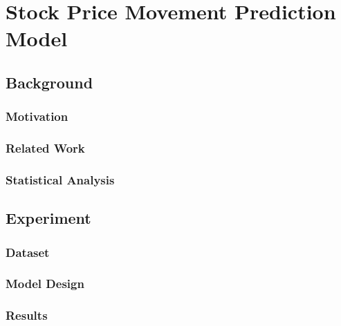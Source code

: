 \chapter{Stock Price Movement Prediction Model}
\label{chapter1}
\section{Background}
\subsection{Motivation}
\subsection{Related Work}
\subsection{Statistical Analysis}
\section{Experiment}
\subsection{Dataset}
\subsection{Model Design}
\subsection{Results}
